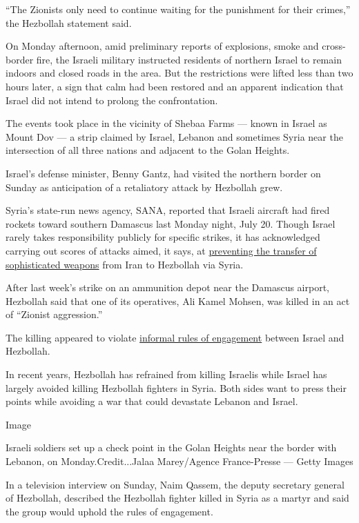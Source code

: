 ``The Zionists only need to continue waiting for the punishment for
their crimes,'' the Hezbollah statement said.

On Monday afternoon, amid preliminary reports of explosions, smoke and
cross-border fire, the Israeli military instructed residents of northern
Israel to remain indoors and closed roads in the area. But the
restrictions were lifted less than two hours later, a sign that calm had
been restored and an apparent indication that Israel did not intend to
prolong the confrontation.

The events took place in the vicinity of Shebaa Farms --- known in
Israel as Mount Dov --- a strip claimed by Israel, Lebanon and sometimes
Syria near the intersection of all three nations and adjacent to the
Golan Heights.

Israel's defense minister, Benny Gantz, had visited the northern border
on Sunday as anticipation of a retaliatory attack by Hezbollah grew.

Syria's state-run news agency, SANA, reported that Israeli aircraft had
fired rockets toward southern Damascus last Monday night, July 20.
Though Israel rarely takes responsibility publicly for specific strikes,
it has acknowledged carrying out scores of attacks aimed, it says, at
\href{https://www.nytimes3xbfgragh.onion/2019/08/28/world/middleeast/israel-iran-shadow-war.html?action=click\&module=RelatedLinks\&pgtype=Article}{preventing
the transfer of sophisticated weapons} from Iran to Hezbollah via Syria.

After last week's strike on an ammunition depot near the Damascus
airport, Hezbollah said that one of its operatives, Ali Kamel Mohsen,
was killed in an act of ``Zionist aggression.''

The killing appeared to violate
\href{https://www.nytimes3xbfgragh.onion/2019/08/28/world/middleeast/israel-iran-shadow-war.html}{informal
rules of engagement} between Israel and Hezbollah.

In recent years, Hezbollah has refrained from killing Israelis while
Israel has largely avoided killing Hezbollah fighters in Syria. Both
sides want to press their points while avoiding a war that could
devastate Lebanon and Israel.

Image

Israeli soldiers set up a check point in the Golan Heights near the
border with Lebanon, on Monday.Credit...Jalaa Marey/Agence France-Presse
--- Getty Images

In a television interview on Sunday, Naim Qassem, the deputy secretary
general of Hezbollah, described the Hezbollah fighter killed in Syria as
a martyr and said the group would uphold the rules of engagement.

